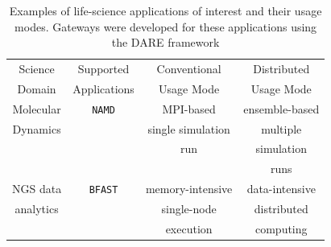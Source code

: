 \documentclass[]{svjour3}
\begin{document}


\begin{table}
\centering
 \small
\begin{tabular}{|c|c|c|c|} 
  \hline Science  & Supported  & Conventional   &   Distributed
  \\
  Domain & Applications & Usage Mode & Usage Mode\\ \hline \hline 
  
  Molecular   &  \texttt{NAMD} &  MPI-based  & ensemble-based   \\
  Dynamics  &  & single simulation  & multiple  \\ 
  &  & run &  simulation  \\ 
  &  &  &  runs \\ \hline
    NGS data     &  \texttt{BFAST} & memory-intensive  & data-intensive\\ 
  analytics  &  &  single-node   &  distributed  \\
  & & execution  & computing \\ \hline
    \hline
\end{tabular} \caption{Examples of life-science applications of
  interest and their usage modes.  Gateways were developed for these
  applications using the DARE framework }
 \label{table:four-applications} 
\end{table}

\end{document}

